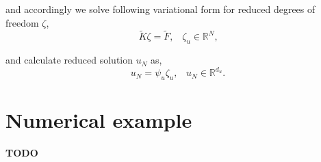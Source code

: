 \documentclass[a4paper,oneside,openright,spanish,english]{book}
\begin{document}
and accordingly we solve following variational form for reduced degrees of freedom $\zeta$,
\begin{equation}
\tilde{K} \zeta = \tilde{F} \textrm{,} \quad \zeta_u \in \mathbb{R}^{N} \textrm{,}
\end{equation}

and calculate reduced solution $u_N$ as,
\begin{equation}
u_N = \psi_u \zeta_u \textrm{,} \quad u_N \in \mathbb{R}^{d_u} \textrm{.}
\end{equation}

\chapter{Numerical example}

\textbf{TODO}
\end{document}

